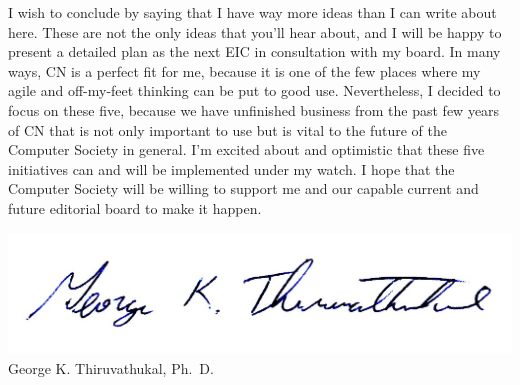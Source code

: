 \documentclass[11pt,english]{luclet}
\begin{document}
I wish to conclude by saying that I have way more ideas than I can
write about here. These are not the only ideas that you'll hear about,
and I will be happy to present a detailed plan as the next EIC in
consultation with my board. In many ways, CN is a perfect fit for me,
because it is one of the few places where my agile and off-my-feet
thinking can be put to good use. Nevertheless, I decided to focus on
these five, because we have unfinished business from the past few
years of CN that is not only important to use but is vital to the
future of the Computer Society in general. I'm excited about and
optimistic that these five initiatives can and will be implemented
under my watch. I hope that the Computer Society will be willing to
support me and our capable current and future editorial board to make
it happen.

\includegraphics[scale=0.7]{signature.jpg}\\
George K. Thiruvathukal, Ph.\ D.
\end{document}
